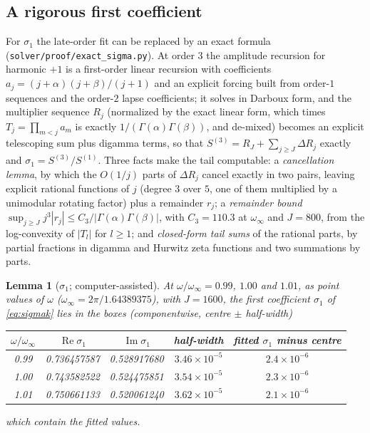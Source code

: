\documentclass{amsart}
\numberwithin{equation}{section}
\theoremstyle{plain}
\newtheorem{lemma}[definition]{Lemma}
\theoremstyle{definition}
\theoremstyle{remark}
\newcommand{\winf}{\omega_\infty}
\newcommand{\re}{\operatorname{Re}}
\newcommand{\im}{\operatorname{Im}}
\newcommand{\repo}[1]{\texttt{#1}}
\begin{document}
\subsection{A rigorous first coefficient}
For $\sigma_1$ the late-order fit can be replaced by an exact formula (\repo{solver/proof/exact\_sigma.py}). At order $3$ the
amplitude recursion for harmonic $+1$ is a first-order linear recursion with coefficients $a_j = (j+\alpha)(j+\beta)/(j+1)$ and an
explicit forcing built from order-$1$ sequences and the order-$2$ lapse coefficients; it solves in Darboux form, and the
multiplier sequence $R_j$ (normalized by the exact linear form, which times $T_j = \prod_{m<j}a_m$ is exactly
$1/(\Gamma(\alpha)\Gamma(\beta))$, and de-mixed) becomes an explicit telescoping sum plus digamma terms, so that
$S^{(3)} = R_J + \sum_{j\ge J}\Delta R_j$ exactly and $\sigma_1 = S^{(3)}/S^{(1)}$. Three facts make the tail computable: a
\emph{cancellation lemma}, by which the $O(1/j)$ parts of $\Delta R_j$ cancel exactly in two pairs, leaving explicit rational
functions of $j$ (degree $3$ over $5$, one of them multiplied by a unimodular rotating factor) plus a remainder $r_j$; a
\emph{remainder bound} $\sup_{j\ge J}j^3|r_j| \le C_3/|\Gamma(\alpha)\Gamma(\beta)|$, with $C_3 = 110.3$ at $\winf$ and
$J = 800$, from the log-convexity of $|T_l|$ for $l \ge 1$; and \emph{closed-form tail sums} of the rational parts, by partial fractions in digamma and Hurwitz zeta
functions and two summations by parts.

\begin{lemma}[$\sigma_1$; computer-assisted]\label{lem:sigma1}
At $\omega/\winf = 0.99$, $1.00$ and $1.01$, as point values of $\omega$ ($\winf = 2\pi/1.64389375$), with $J = 1600$, the first
coefficient $\sigma_1$ of \eqref{eq:sigmak} lies in the boxes (componentwise, centre $\pm$ half-width)
\begin{center}\footnotesize
\begin{tabular}{ccccc}
\toprule
$\omega/\winf$ & $\re\sigma_1$ & $\im\sigma_1$ & half-width & fitted $\sigma_1$ minus centre \\
\midrule
0.99 & 0.736457587 & 0.528917680 & $3.46\times10^{-5}$ & $2.4\times10^{-6}$ \\
1.00 & 0.743582522 & 0.524475851 & $3.54\times10^{-5}$ & $2.3\times10^{-6}$ \\
1.01 & 0.750661133 & 0.520061240 & $3.62\times10^{-5}$ & $2.1\times10^{-6}$ \\
\bottomrule
\end{tabular}
\end{center}
which contain the fitted values.
\end{lemma}
\end{document}
